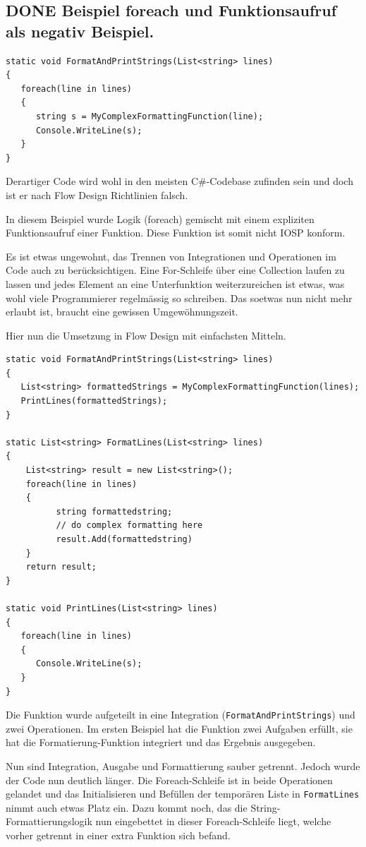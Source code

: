 \documentclass[11pt]{article}
\begin{document}
\subsection{{\bfseries\sffamily DONE} Beispiel foreach und Funktionsaufruf als negativ Beispiel.}
\label{sec:orgheadline35}
\begin{verbatim}
static void FormatAndPrintStrings(List<string> lines)
{
   foreach(line in lines)
   {
      string s = MyComplexFormattingFunction(line);
      Console.WriteLine(s);
   }
}
\end{verbatim}
Derartiger Code wird wohl in den meisten C\#-Codebase zufinden sein und doch ist er nach Flow Design Richtlinien falsch.

In diesem Beispiel wurde Logik (foreach) gemischt mit einem expliziten Funktionsaufruf einer Funktion.
Diese Funktion ist somit nicht IOSP konform.

Es ist etwas ungewohnt, das Trennen von Integrationen und Operationen im Code auch zu berücksichtigen.
Eine For-Schleife über eine Collection laufen zu lassen und jedes Element an eine Unterfunktion weiterzureichen ist etwas,
was wohl viele Programmierer regelmässig so schreiben.
Das soetwas nun nicht mehr erlaubt ist, braucht eine gewissen Umgewöhnungszeit.


Hier nun die Umsetzung in Flow Design mit einfachsten Mitteln.



\begin{verbatim}
static void FormatAndPrintStrings(List<string> lines)
{
   List<string> formattedStrings = MyComplexFormattingFunction(lines);
   PrintLines(formattedStrings);
}

static List<string> FormatLines(List<string> lines)
{
    List<string> result = new List<string>();
    foreach(line in lines)
    {
          string formattedstring;
          // do complex formatting here
          result.Add(formattedstring) 
    }
    return result;
}

static void PrintLines(List<string> lines)
{
   foreach(line in lines)
   {
      Console.WriteLine(s);
   }
}
\end{verbatim}

Die Funktion wurde aufgeteilt in eine Integration (\texttt{FormatAndPrintStrings}) und zwei Operationen.
Im ersten Beispiel hat die Funktion zwei Aufgaben erfüllt, sie hat die Formatierung-Funktion integriert und 
das Ergebnis ausgegeben.

Nun sind Integration, Ausgabe und Formattierung sauber getrennt.
Jedoch wurde der Code nun deutlich länger. Die Foreach-Schleife ist in beide Operationen gelandet und das Initialisieren und
Befüllen der temporären Liste in \texttt{FormatLines} nimmt auch etwas Platz ein.
Dazu kommt noch, das die String-Formattierungslogik nun eingebettet in dieser Foreach-Schleife liegt, welche vorher getrennt in
einer extra Funktion sich befand. 
\end{document}
